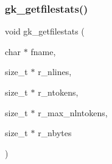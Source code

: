 \subsubsection{\texorpdfstring{gk\+\_\+getfilestats()}{gk\_getfilestats()}}
{\footnotesize\ttfamily void gk\+\_\+getfilestats (\begin{DoxyParamCaption}\item[{char $\ast$}]{fname,  }\item[{size\+\_\+t $\ast$}]{r\+\_\+nlines,  }\item[{size\+\_\+t $\ast$}]{r\+\_\+ntokens,  }\item[{size\+\_\+t $\ast$}]{r\+\_\+max\+\_\+nlntokens,  }\item[{size\+\_\+t $\ast$}]{r\+\_\+nbytes }\end{DoxyParamCaption})}

